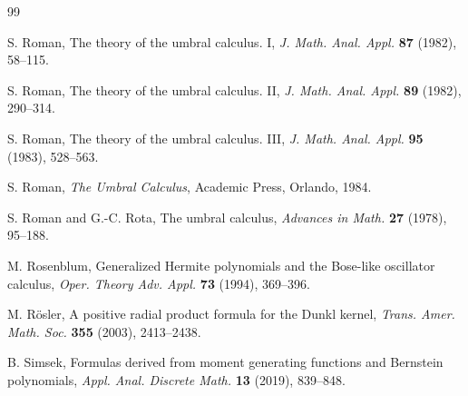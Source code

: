 \documentclass[11pt]{article}
\theoremstyle{plain}
\theoremstyle{remark}
\numberwithin{equation}{section} %
\begin{document}
\begin{thebibliography}{99}



S. Roman,
The theory of the umbral calculus. I,
\textit{J. Math. Anal. Appl.}
\textbf{87} (1982), 58--115.

S. Roman,
The theory of the umbral calculus. II,
\textit{J. Math. Anal. Appl.}
\textbf{89} (1982), 290--314.

S. Roman,
The theory of the umbral calculus. III,
\textit{J. Math. Anal. Appl.}
\textbf{95} (1983), 528--563.

S. Roman,
\textit{The Umbral Calculus},
Academic Press, Orlando, 1984.

S. Roman and G.-C. Rota, %
{The umbral calculus},
\textit{Advances in Math.} \textbf{27} (1978), 95--188. %

M. Rosenblum,
{Generalized Hermite polynomials and the Bose-like oscillator calculus},
\textit{Oper. Theory Adv. Appl.}
\textbf{73} (1994), 369--396.


M. R\"osler,
A positive radial product formula for the Dunkl kernel,
\textit{Trans. Amer. Math. Soc.}
\textbf{355} (2003), 2413--2438.


B. Simsek,
Formulas derived from moment generating functions and Bernstein polynomials,
\textit{Appl. Anal. Discrete Math.}
\textbf{13} (2019), 839--848. %




\end{thebibliography}
\end{document}
